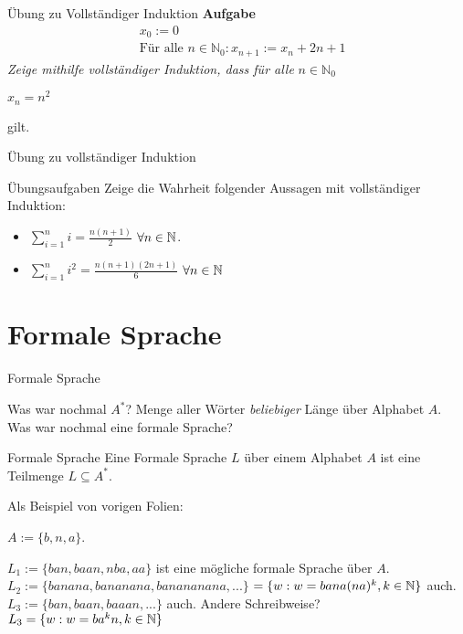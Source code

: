 \documentclass{beamer}
\begin{document}
\begin{frame}{Übung zu Vollständiger Induktion}
	\textbf{Aufgabe}\\
	\begin{eqnarray*}
		&x_0 := 0\\
		&\text{Für alle } n \in \mathbb{N}_0: x_{n+1} := x_n + 2n +1
	\end{eqnarray*}			
	\textit{Zeige mithilfe vollständiger Induktion, dass für alle} $n \in \mathbb{N}_0$ \\
	\begin{center}$x_n = n^2$\end{center}
	gilt.
\end{frame}

\begin{frame}{Übung zu vollständiger Induktion}
	\begin{taskblock}{Übungsaufgaben}
		Zeige die Wahrheit folgender Aussagen mit vollständiger Induktion:
		
		\begin{itemize}
			\item $\sum\limits_{i=1}^n i = \frac{n(n+1)}{2}$ $\forall n \in \mathbb{N}$.
			\item $\sum\limits_{i=1}^n i^2 = \frac{n(n+1)(2n+1)}{6}$ $\forall n \in \mathbb{N}$
		\end{itemize}
	\end{taskblock}
\end{frame}

\section{Formale Sprache}

\begin{frame}{Formale Sprache}
	\begin{itemize}
		\pitem Was war nochmal $A^*$? Menge aller Wörter \emph{beliebiger} Länge über Alphabet $A$.
		\pitem Was war nochmal eine formale Sprache?
	\end{itemize}
	
	\pause
	
	\begin{block}{Formale Sprache}
		Eine Formale Sprache $L$ über einem Alphabet $A$ ist eine Teilmenge $L \subseteq A^*$.
	\end{block}

	\pause Als Beispiel von vorigen Folien:
	
	\begin{itemize}
		\pitem $A := \{b, n, a\}$.
		\begin{itemize}
			\pitem $L_1 := \{ban, baan, nba, aa\}$ ist eine mögliche formale Sprache über $A$.
			\pitem $L_2 := \{banana, bananana, banananana, ...\}$ \pause $ = \{w : w = bana(na)^k, k \in \mathbb{N}\}$ auch.
			\pitem $L_3 := \{ban, baan, baaan, ...\}$ auch. \pause Andere Schreibweise? \pause \\ $ L_3 = \{w : w = ba^kn, k \in \mathbb{N} \}$
		\end{itemize}
	\end{itemize}
\end{frame}
\end{document}
